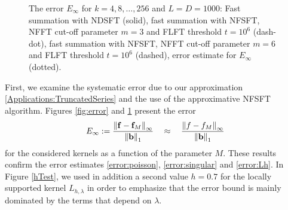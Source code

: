 \begin{figure}[tb]
  \centering
  \hfill
  \caption{The error $E_{\infty}$ for $k = 4,8,\ldots,256$ and $L = D = 1000$: 
  Fast summation with NDSFT (solid), fast summation with NFSFT, 
  NFFT cut-off parameter $m = 3$ and FLFT threshold $t = 10^6$ (dash-dot), 
  fast summation with NFSFT, NFFT cut-off parameter $m = 6$ and FLFT threshold 
  $t = 10^6$ (dashed), error estimate for $E_{\infty}$ (dotted).}
  \label{fig:error2}
\end{figure}

First, we examine the systematic error due to our approximation 
\eqref{Applications:TruncatedSeries} and the use of the 
approximative NFSFT algorithm. Figures \ref{fig:error} and
\ref{fig:error2} present
the error
\[
  E_{\infty}:=
  \frac{\left\|\mathbf{f}-\mathbf{f}_M\right\|_{\infty}}{\left\|\mathbf{b}\right\|_{1}}
  \quad \approx \quad \frac{\left\|f-f_M\right\|_{\infty}}{\left\|\mathbf{b}\right\|_{1}}
\]
for the considered kernels as a function of the parameter $M$.
These results confirm the error estimates \eqref{error:poisson},
\eqref{error:singular} and \eqref{error:Lh}. 
In Figure \ref{hTest},
we used in addition a second value $h=0.7$ for the locally supported 
kernel $L_{h,\lambda}$ in order to emphasize that the error 
bound is mainly dominated by the terms that depend on $\lambda$.

